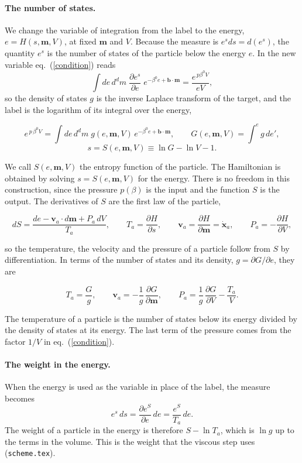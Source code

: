 \documentclass[11pt,aps,preprint,nofootinbib,superscriptaddress,tightenlines]{revtex4-2}
\def\st{\begin{equation}}
\def\stp{\end{equation}}
\def\Eq#1{eq.~(\ref{#1})}
\let\oldparagraph\paragraph
\renewcommand{\paragraph}{\par\bigskip\oldparagraph}
\begin{document}
\paragraph{The number of states.}  We change the variable of integration from the label to the energy, $e=H(s,\bm m,V)$, at fixed $\bm m$ and $V$.
Because the measure is $e^sds=d(e^s)$, the quantity $e^{s}$ is the number of states of the particle below the energy $e$.  In the new variable
\Eq{condition} reads
\st
\int de\,d^dm\;\frac{\partial e^{s}}{\partial e}\;e^{-\beta^0e+\bm b\cdot\bm m}=\frac{e^{\,p\beta^0V}}{eV} ,
\stp
so the density of states $g$ is the inverse Laplace transform of the target, and the label is the logarithm of its integral over the energy,
\begin{keyeq}
\st
e^{\,p\,\beta^0V}=\int de\,d^dm\;g(e,\bm m,V)\,e^{-\beta^0e+\bm b\cdot\bm m},\qquad
G(e,\bm m,V)=\int^{e}\!g\,de' ,
\stp
\st
s=S(e,\bm m,V)\equiv\ln G-\ln V-1 .
\label{Sdef}
\stp
\end{keyeq}
We call $S(e,\bm m,V)$ the entropy function of the particle.  The Hamiltonian is obtained by solving $s=S(e,\bm m,V)$ for the energy.  There is no
freedom in this construction, since the pressure $p(\beta)$ is the input and the function $S$ is the output.  The derivatives of $S$ are the first
law of the particle,
\begin{keyeq}
\st
dS=\frac{de-\bm v_a\cdot d\bm m+P_a\,dV}{T_a},\qquad
T_a=\frac{\partial H}{\partial s},\qquad \bm v_a=\frac{\partial H}{\partial\bm m}=\dot{\bm x}_a,\qquad P_a=-\frac{\partial H}{\partial V} ,
\label{firstlaw}
\stp
\end{keyeq}
so the temperature, the velocity and the pressure of a particle follow from $S$ by differentiation.  In terms of the number of states and its
density, $g=\partial G/\partial e$, they are
\begin{keyeq}
\st
T_a=\frac Gg,\qquad \bm v_a=-\frac1g\,\frac{\partial G}{\partial\bm m},\qquad P_a=\frac1g\,\frac{\partial G}{\partial V}-\frac{T_a}V .
\label{fromG}
\stp
\end{keyeq}
The temperature of a particle is the number of states below its energy divided by the density of states at its energy.  The last term of the
pressure comes from the factor $1/V$ in \Eq{condition}.

\paragraph{The weight in the energy.}  When the energy is used as the variable in place of the label, the measure becomes
\st
e^{s}\,ds=\frac{\partial e^{S}}{\partial e}\,de=\frac{e^{S}}{T_a}\,de .
\stp
The weight of a particle in the energy is therefore $S-\ln T_a$, which is $\ln g$ up to the terms in
the volume.  This is the weight that the viscous step uses (\nolinkurl{scheme.tex}).
\end{document}
